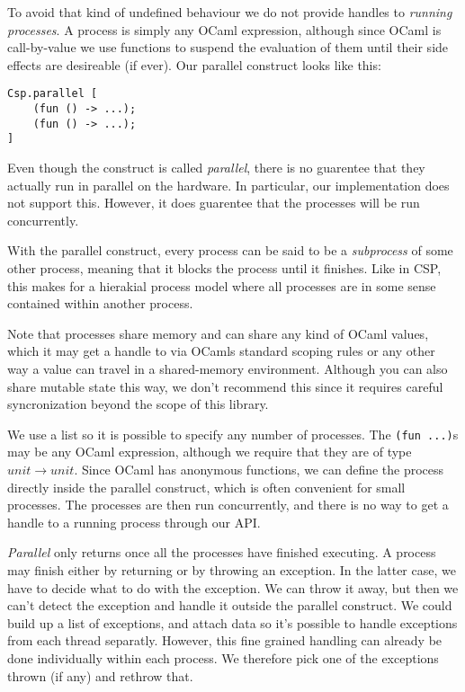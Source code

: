 \documentclass[a4paper,12pt]{article}
\begin{document}
To avoid that kind of undefined behaviour we do not provide handles to 
\emph{running processes}.
A process is simply any OCaml expression, although since OCaml is
call-by-value we use functions to suspend the evaluation of them until their
side effects are desireable (if ever). Our parallel construct looks like this:

\begin{verbatim}
Csp.parallel [
    (fun () -> ...);
    (fun () -> ...);
]
\end{verbatim}

Even though the construct is called \emph{parallel}, there is no guarentee that
they actually run in parallel on the hardware. In particular, our implementation
does not support this. However, it does guarentee that the processes will be run
concurrently.

With the parallel construct, every process can be said to be a \emph{subprocess}
of some other process, meaning that it blocks the process until it finishes.
Like in CSP, this makes for a hierakial process model where all processes are in
some sense contained within another process.

Note that processes share memory and can share any kind of OCaml values, which
it may get a handle to via OCamls standard scoping rules or any other way a
value can travel in a shared-memory environment. Although you can also share
mutable state this way, we don't recommend this since it requires careful
syncronization beyond the scope of this library.

We use a list so it is possible to specify any number of processes. The 
\verb|(fun ...)|s may be any OCaml expression, although we require that they are of type
$unit \to unit$. Since OCaml has anonymous functions, we can define the process directly 
inside the parallel construct, which is often convenient for small processes. The processes
are then run concurrently, and there is no way to get a handle to a running
process through our API.

{\it Parallel} only returns once all the processes have finished executing. A
process may finish either by returning or by throwing an exception. In the
latter case, we have to decide what to do with the exception. We can throw it
away, but then we can't detect the exception and handle it outside the parallel
construct. We could build up a list of exceptions, and attach data so it's
possible to handle exceptions from each thread separatly. However, this fine
grained handling can already be done individually within each process. We
therefore pick one of the exceptions thrown (if any) and rethrow that. 
\end{document}
